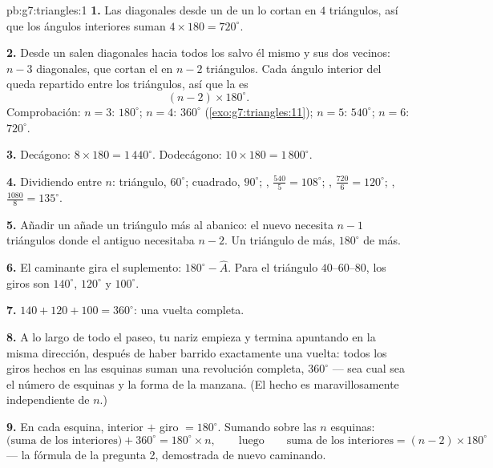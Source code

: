 \begin{solution}{pb:g7:triangles:1}
\textbf{1.} Las diagonales desde un  de un  lo cortan
en $4$ triángulos, así que los ángulos interiores suman
$4 \times 180 = 720^\circ$.

\textbf{2.} Desde un  salen diagonales hacia todos los  salvo
él mismo y sus dos vecinos: $n - 3$ diagonales, que cortan el
 en $n - 2$ triángulos. Cada ángulo interior del
 queda repartido entre los triángulos, así que la  es
\[
(n - 2) \times 180^\circ .
\]
Comprobación: $n = 3$: $180^\circ$; $n = 4$: $360^\circ$
(\cref{exo:g7:triangles:11}); $n = 5$: $540^\circ$; $n = 6$:
$720^\circ$.

\textbf{3.} Decágono: $8 \times 180 = 1\,440^\circ$. Dodecágono:
$10 \times 180 = 1\,800^\circ$.

\textbf{4.} Dividiendo entre $n$: triángulo, $60^\circ$; cuadrado,
$90^\circ$; , $\frac{540}{5} = 108^\circ$; ,
$\frac{720}{6} = 120^\circ$; , $\frac{1080}{8} =
135^\circ$.

\textbf{5.} Añadir un  añade un triángulo más al abanico:
el  nuevo necesita $n - 1$ triángulos donde el antiguo necesitaba
$n - 2$. Un triángulo de más, $180^\circ$ de más.

\textbf{6.} El caminante gira el suplemento:
$180^\circ - \widehat A$. Para el triángulo $40$--$60$--$80$, los
giros son $140^\circ$, $120^\circ$ y $100^\circ$.

\textbf{7.} $140 + 120 + 100 = 360^\circ$: una vuelta completa.

\textbf{8.} A lo largo de todo el paseo, tu nariz empieza y termina
apuntando en la misma dirección, después de haber barrido exactamente una vuelta: todos los
giros hechos en las esquinas suman una revolución completa,
$360^\circ$ --- sea cual sea el número de esquinas y la forma de
la manzana. (El hecho es maravillosamente independiente de $n$.)

\textbf{9.} En cada esquina, interior $+$ giro $= 180^\circ$.
Sumando sobre las $n$ esquinas:
\[
\text{(suma de los interiores)} + 360^\circ = 180^\circ \times n,
\qquad\text{luego}\qquad
\text{suma de los interiores} = (n - 2) \times 180^\circ
\]
--- la fórmula de la pregunta 2, demostrada de nuevo caminando.


\end{solution}
